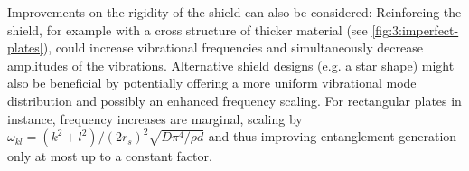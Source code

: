 Improvements on the rigidity of the shield can also be considered:
Reinforcing the shield, for example with a cross structure of thicker material (see \cref{fig:3:imperfect-plates}), could increase vibrational frequencies and simultaneously decrease amplitudes of the vibrations.
Alternative shield designs (e.g. a star shape) might also be beneficial by potentially offering a more uniform vibrational mode distribution and possibly an enhanced frequency scaling. 
For rectangular plates in instance, frequency increases are marginal, scaling by $\omega_{kl} = (k^2 + l^2)/(2r_s)^2 \sqrt{D \pi^4 / \rho d}$ \cite[p. 471-474]{Rao_2019} and thus improving entanglement generation only at most up to a constant factor.